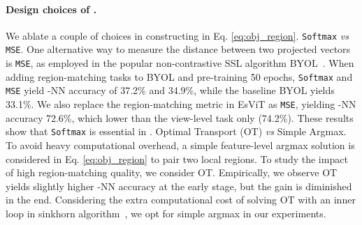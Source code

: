 \documentclass{article} \usepackage{iclr2022_conference,times}
\newcommand{\shortname}{EsViT}
\begin{document}
\paragraph{Design choices of .} We ablate a couple of choices in constructing  in Eq. \eqref{eq:obj_region}. 
 \texttt{Softmax} {\em vs} \texttt{MSE}. One alternative way to measure the distance between two projected vectors is \texttt{MSE}, as employed in the popular non-contrastive SSL algorithm BYOL~\citep{grill2020bootstrap}. When adding region-matching tasks to BYOL and pre-training 50 epochs, \texttt{Softmax} and \texttt{MSE} yield -NN accuracy of 37.2\% and 34.9\%, while the baseline BYOL yields 33.1\%. We also replace the region-matching metric in \shortname{} as \texttt{MSE}, yielding -NN accuracy 72.6\%, which lower than the view-level task only (74.2\%). These results show that  \texttt{Softmax} is essential in .
 Optimal Transport (OT) {\em vs} Simple Argmax. To avoid heavy computational overhead, a simple feature-level argmax solution is considered in Eq. \eqref{eq:obj_region} to pair two local regions. To study the impact of high region-matching quality, we consider OT. Empirically, we observe OT yields slightly higher -NN accuracy at the early stage, but the gain is diminished in the end. Considering the extra computational cost of solving OT with an inner loop in sinkhorn algorithm~\citep{cuturi2013sinkhorn}, we opt for simple argmax in our experiments.   
\end{document}

